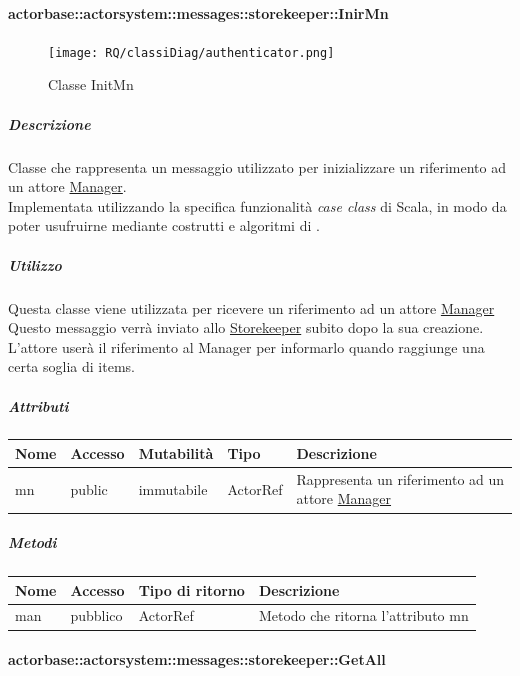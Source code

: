 \documentclass{scalatekids-article}
\begin{document}
\paragraph{actorbase::actorsystem::messages::storekeeper::InirMn}
\label{sec:actorbase::actorsystem::messages::storekeeper::InitMn}

\begin{figure}[H]
  \begin{center}
    \texttt{[image: RQ/classiDiag/authenticator.png]}
    \caption{Classe InitMn}
  \end{center}
\end{figure}

\subparagraph{Descrizione}
Classe che rappresenta un messaggio utilizzato per inizializzare un riferimento ad un attore \hyperref[sec:actorbase::actorsystem::actors::manager::Manager]{Manager}.\\Implementata utilizzando la specifica funzionalità \textit{case class} di Scala,
in modo da poter usufruirne mediante costrutti e algoritmi di
.

\subparagraph{Utilizzo}
Questa classe viene utilizzata per ricevere un riferimento ad un attore
\hyperref[sec:actorbase::actorsystem::actors::manager::Manager]{Manager}
Questo messaggio verrà inviato allo \hyperref[sec:actorbase::actorsystem::actors::storekeeper::Storekeeper]{Storekeeper}
subito dopo la sua creazione.\\L'attore userà il riferimento al Manager per
informarlo quando raggiunge una certa soglia di items.

\subparagraph{Attributi}
\begin{tabular}{| p{2cm} | p{1.5cm} | p{2cm} | p{3cm} | p{8.5cm} |}
  \hline
  Nome & Accesso & Mutabilità & Tipo & Descrizione\\
  \hline
  mn & public & immutabile & ActorRef & Rappresenta un riferimento ad un attore \hyperref[sec:actorbase::actorsystem::actors::manager::Manager]{Manager}\\
  \hline
\end{tabular}

\subparagraph{Metodi}
\begin{tabular}{| l | l | l | l |}
  \hline
  Nome & Accesso & Tipo di ritorno & Descrizione\\
  \hline
  man & pubblico & ActorRef & Metodo che ritorna l'attributo mn\\
  \hline
\end{tabular}

\paragraph{actorbase::actorsystem::messages::storekeeper::GetAll}
\label{sec:actorbase::actorsystem::messages::storekeeper::GetAll}
\end{document}
